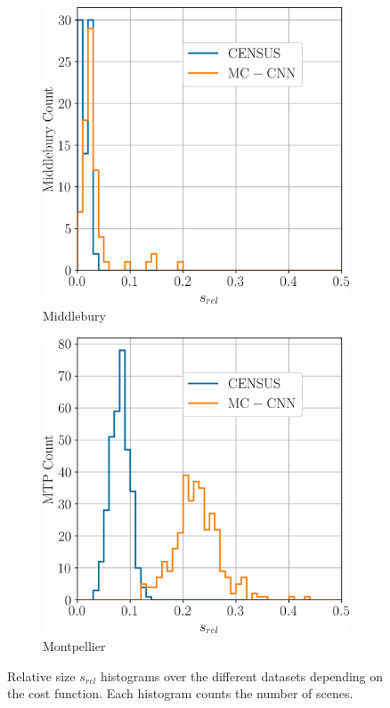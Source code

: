 \begin{figure}
    \centering
    \begin{subfigure}[t]{0.5\linewidth}
        \centering
        \includegraphics[width=\linewidth]{Images/Chap_5/histogram_s_rel_middlebury.png}
        \caption{Middlebury}
        \label{fig:s_rel_middlebury}
    \end{subfigure}\hfill
    \begin{subfigure}[t]{0.5\linewidth}
        \centering
        \includegraphics[width=\linewidth]{Images/Chap_5/histogram_s_rel_mtp.png}
        \caption{Montpellier}
        \label{fig:s_rel_mtp}
    \end{subfigure}
    \caption{Relative size $s_{rel}$  histograms over the different datasets depending on the cost function. Each histogram counts the number of scenes.}
    \label{fig:s_rel_hist}
\end{figure}

